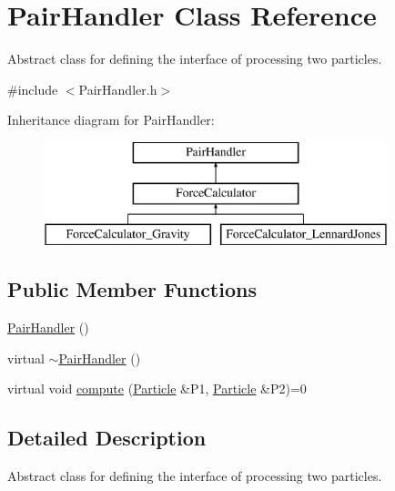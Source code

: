 \hypertarget{classPairHandler}{\section{Pair\-Handler Class Reference}
\label{classPairHandler}
}


Abstract class for defining the interface of processing two particles.  




{\ttfamily \#include $<$Pair\-Handler.\-h$>$}

Inheritance diagram for Pair\-Handler\-:\begin{figure}[H]
\begin{center}
\leavevmode
\includegraphics[height=3.000000cm]{classPairHandler}
\end{center}
\end{figure}
\subsection*{Public Member Functions}
\begin{DoxyCompactItemize}
\item 
\hyperlink{classPairHandler_a6df65a5a7c3ee04203acdfd10af6c3be}{Pair\-Handler} ()
\item 
virtual \hyperlink{classPairHandler_a6ee9b36ebb340c37f9d221ee5ae61096}{$\sim$\-Pair\-Handler} ()
\item 
virtual void \hyperlink{classPairHandler_a2811e5957b516f41e1cb52c71af3f6e9}{compute} (\hyperlink{classParticle}{Particle} \&P1, \hyperlink{classParticle}{Particle} \&P2)=0
\end{DoxyCompactItemize}


\subsection{Detailed Description}
Abstract class for defining the interface of processing two particles. 


